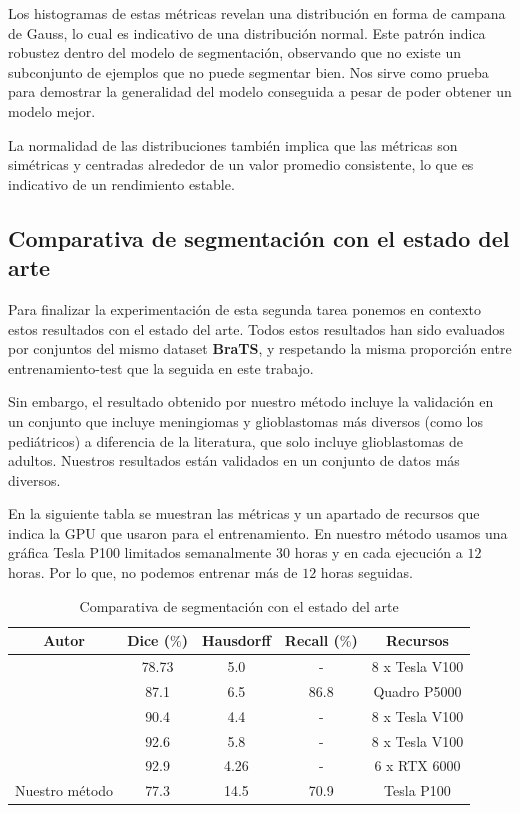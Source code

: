 Los histogramas de estas métricas revelan una distribución en forma de campana de Gauss, lo cual es indicativo de una distribución normal. Este patrón indica robustez dentro del modelo de segmentación, observando que no existe un subconjunto de ejemplos que no puede segmentar bien. Nos sirve como prueba para demostrar la generalidad del modelo conseguida a pesar de poder obtener un modelo mejor.

La normalidad de las distribuciones también implica que las métricas son simétricas y centradas alrededor de un valor promedio consistente, lo que es indicativo de un rendimiento estable.

\subsection{Comparativa de segmentación con el estado del arte}

Para finalizar la experimentación de esta segunda tarea ponemos en contexto estos resultados con el estado del arte. Todos estos resultados han sido evaluados por conjuntos del mismo dataset \textbf{BraTS}, y respetando la misma proporción entre entrenamiento-test que la seguida en este trabajo.

Sin embargo, el resultado obtenido por nuestro método incluye la validación en un conjunto que incluye meningiomas y glioblastomas más diversos (como los pediátricos) a diferencia de la literatura, que solo incluye glioblastomas de adultos. Nuestros resultados están validados en un conjunto de datos más diversos.

En la siguiente tabla se muestran las métricas y un apartado de recursos que indica la GPU que usaron para el entrenamiento. En nuestro método usamos una gráfica Tesla P100 limitados semanalmente $30$ horas y en cada ejecución a $12$ horas. Por lo que, no podemos entrenar más de $12$ horas seguidas.

\begin{table}[H]
	\centering
	\begin{tabular}{|ccccc|}
		\toprule
		Autor & Dice ($\%$) & Hausdorff & Recall ($\%$) & Recursos \\
		\midrule
		\cite{chen2021transunet} & 78.73 & 5.0 & - & 8 x Tesla V100 \\
		\cite{zhou2021latent} & 87.1 & 6.5 & 86.8 & Quadro P5000 \\
		\cite{myronenko20193d} & 90.4 & 4.4 & - & 8 x Tesla V100\\   
		\cite{hatamizadeh2021swin} & 92.6 & 5.8 & - & 8 x Tesla V100 \\ 
		\cite{ferreira2024we} & 92.9 & 4.26 & - & 6 x RTX 6000\\
		Nuestro método & 77.3 & 14.5 & 70.9 & Tesla P100 \\ 
		\bottomrule
	\end{tabular}
	\caption{Comparativa de segmentación con el estado del arte}
	\label{tabla:resultados13}
\end{table}


